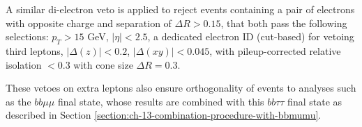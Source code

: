 A similar di-electron veto is applied to reject events containing a pair of electrons with opposite charge and separation of $\Delta R > 0.15$, that both pass the following selections: $p_T > 15$ GeV, $|\eta| < 2.5$, a dedicated electron ID (cut-based) for vetoing third leptons, $|\Delta(z)| < 0.2$, $|\Delta(xy)| < 0.045$, with pileup-corrected relative isolation $<0.3$ with cone size $\Delta R = 0.3$. 

These vetoes on extra leptons also ensure orthogonality of events to analyses such as the $bb\mu\mu$ final state, whose results are combined with this $bb\tau\tau$ final state as described in Section \ref{section:ch-13-combination-procedure-with-bbmumu}.